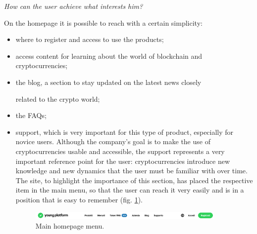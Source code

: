 \centerline{\textit{How can the user achieve what interests him?}}
On the homepage it is possible to reach with a certain simplicity:
\begin{itemize}
  \item where to register and access to use the products;

  \item access content for learning about the world of blockchain and 
  cryptocurrencies;

  \item the blog, a section to stay updated on the latest news closely 
  
  related to the crypto world;

  \item the FAQs;

  \item support, which is very important for this type of product, 
  especially for novice users. Although the company's goal is to make the 
  use of cryptocurrencies usable and accessible, the support represents a 
  very important reference point for the user: cryptocurrencies introduce 
  new knowledge and new dynamics that the user must be familiar with over 
  time. The site, to highlight the importance of this section, has placed 
  the respective item in the main menu, so that the user can reach it very 
  easily and is in a position that is easy to remember 
  (fig. \ref{fig:main-menu}).

  \begin{figure}[H]
    \centering
    \includegraphics[width=0.90\textwidth]{res/images/main-menu.png}
    \caption{Main homepage menu.}
    \label{fig:main-menu}
  \end{figure}
\end{itemize}


